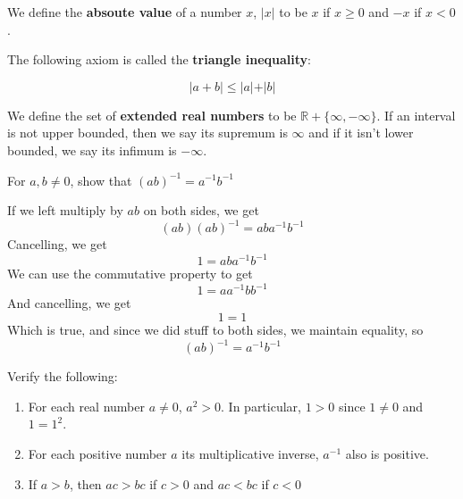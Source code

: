 \documentclass{article}
\begin{document}
\begin{definition}
We define the \textbf{absoute value} of a number $x$, $\vert x\vert$ to be $x$ if $x \geq 0$ and $-x$ if $x < 0$. 

The following axiom is called the \textbf{triangle inequality}:

$$\vert a+b\vert \leq \vert a\vert + \vert b\vert$$   
\end{definition}

\begin{definition}

We define the set of \textbf{extended real numbers} to be $\mathbb{R} + \{\infty, -\infty\}$. If an interval is not upper bounded, then we say its supremum is $\infty$ and if it isn't lower bounded, we say its infimum is $-\infty$. 

\end{definition}

\begin{exercise}[1]
For $a,b \neq 0$, show that $(ab) ^{-1} = a ^{-1} b ^{-1}$
\end{exercise}

\begin{solution}
If we left multiply by $ab$ on both sides, we get $$(ab)(ab) ^{-1} = ab a ^{-1} b ^{-1} $$Cancelling, we get $$1 = ab a ^{-1} b ^{-1} $$We can use the commutative property to get $$1 = a a ^{-1} b b ^{-1} $$And cancelling, we get $$1 = 1$$Which is true, and since we did stuff to both sides, we maintain equality, so $$(ab) ^{-1} = a ^{-1} b ^{-1} $$
\end{solution}

\begin{exercise}[2]
Verify the following:
\begin{enumerate}
    \item For each real number $a\neq0$, $a^2>0$. In particular, $1>0$ since $1\neq0$ and $1=1^2$.
    \item For each positive number $a$ its multiplicative inverse, $a ^{-1}$ also is positive.
    \item If $a>b$, then $ac>bc$ if $c>0$ and $ac<bc$ if $c<0$
    

\end{enumerate}
\end{exercise}
\end{document}
